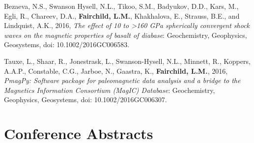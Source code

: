\documentclass[11pt,a4paper,sans]{moderncv}        %
\begin{document}
\begin{etaremune}
\vspace{3pt}

\item{Bezaeva, N.S., Swanson Hysell, N.L., Tikoo, S.M., Badyukov, D.D., Kars, M., Egli, R., Chareev, D.A., \textbf{Fairchild, L.M.}, Khakhalova, E., Strauss, B.E., and Lindquist, A.K., 2016, \textit{The effect of 10 to >160 GPa spherically convergent shock waves on the magnetic properties of basalt of diabase}: Geochemistry, Geophysics, Geosystems, doi: 10.1002/2016GC006583.}

\vspace{3pt}

\item{Tauxe, L., Shaar, R., Jonestrask, L., Swanson-Hysell, N.L., Minnett, R., Koppers, A.A.P., Constable, C.G., Jarboe, N., Gaastra,  K., \textbf{Fairchild, L.M.}, 2016, \textit{PmagPy: Software package for paleomagnetic data analysis and a bridge to the Magnetics Information Consortium (MagIC) Database}: Geochemistry, Geophysics, Geosystems, doi: 10.1002/2016GC006307.}

\end{etaremune}

\section{Conference Abstracts}
\end{document}
